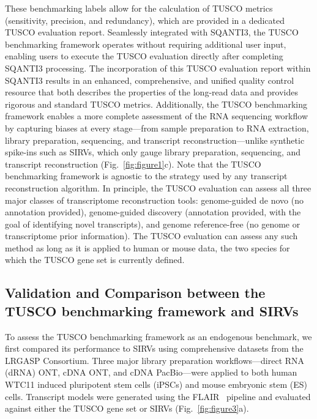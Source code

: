 \documentclass[pdflatex,sn-nature]{sn-jnl}%
\newcommand{\tuscoGeneSet}{TUSCO gene set}
\newcommand{\tuscoBenchmarkingFramework}{TUSCO benchmarking framework}
\newcommand{\tuscoEvaluation}{TUSCO evaluation}
\newcommand{\tuscoMetrics}{TUSCO metrics}
\begin{document}
These benchmarking labels allow for the calculation of \tuscoMetrics{} (sensitivity, precision, and redundancy), which are provided in a dedicated \tuscoEvaluation{} report. Seamlessly integrated with SQANTI3, the \tuscoBenchmarkingFramework{} operates without requiring additional user input, enabling users to execute the \tuscoEvaluation{} directly after completing SQANTI3 processing. The incorporation of this \tuscoEvaluation{} report within SQANTI3 results in an enhanced, comprehensive, and unified quality control resource that both describes the properties of the long-read data and provides rigorous and standard \tuscoMetrics{}. Additionally, the \tuscoBenchmarkingFramework{} enables a more complete assessment of the RNA sequencing workflow by capturing biases at every stage---from sample preparation to RNA extraction, library preparation, sequencing, and transcript reconstruction---unlike synthetic spike-ins such as SIRVs, which only gauge library preparation, sequencing, and transcript reconstruction (Fig.~\ref{fig:figure1}c). Note that the \tuscoBenchmarkingFramework{} is agnostic to the strategy used by any transcript reconstruction algorithm. In principle, the \tuscoEvaluation{} can assess all three major classes of transcriptome reconstruction tools: genome-guided de novo (no annotation provided), genome-guided discovery (annotation provided, with the goal of identifying novel transcripts), and genome reference-free (no genome or transcriptome prior information). The \tuscoEvaluation{} can assess any such method as long as it is applied to human or mouse data, the two species for which the \tuscoGeneSet{} is currently defined.

\subsection{Validation and Comparison between the \tuscoBenchmarkingFramework{} and SIRVs}

To assess the \tuscoBenchmarkingFramework{} as an endogenous benchmark, we first compared its performance to SIRVs using comprehensive datasets from the LRGASP Consortium. Three major library preparation workflows---direct RNA (dRNA) ONT, cDNA ONT, and cDNA PacBio---were applied to both human WTC11 induced pluripotent stem cells (iPSCs) and mouse embryonic stem (ES) cells. Transcript models were generated using the FLAIR~\cite{tang_detecting_2024} pipeline and evaluated against either the \tuscoGeneSet{} or SIRVs (Fig.~\ref{fig:figure3}a).
\end{document}
